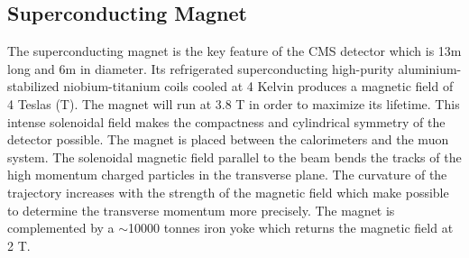\subsection{Superconducting Magnet}
The superconducting magnet is the key feature of the CMS detector which is 13m long and 6m in diameter. Its refrigerated superconducting high-purity aluminium-stabilized niobium-titanium coils cooled at 4 Kelvin produces a magnetic field of 4 Teslas (T). The magnet will run at 3.8 T in order to maximize its lifetime. This intense solenoidal field makes the compactness and cylindrical symmetry of the detector possible. The magnet is placed between the calorimeters and the muon system. The solenoidal magnetic field parallel to the beam bends the tracks of the high momentum charged particles in the transverse plane. The curvature of the trajectory increases with the strength of the magnetic field which make possible to determine the transverse momentum more precisely. The magnet is complemented by a $\sim$10000 tonnes iron yoke which returns the magnetic field at 2 T.

